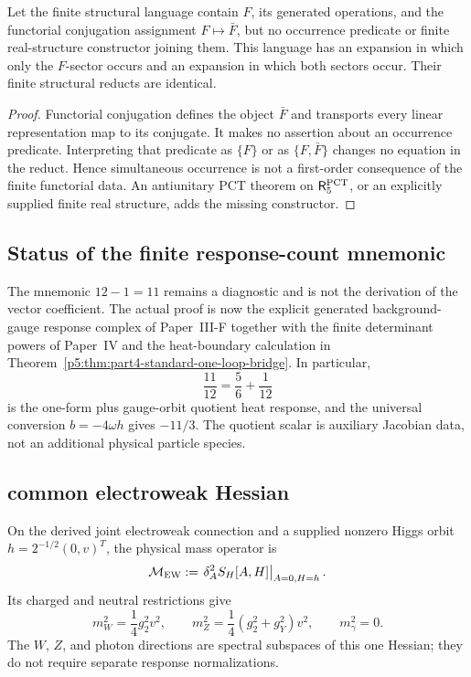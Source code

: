 \documentclass[11pt,a4paper]{article}
\begin{document}
\begin{proposition}
\label{p5:prop:conjugate-occurrence-countermodel}
Let the finite structural language contain \(F\), its generated operations,
and the functorial conjugation assignment \(F\mapsto\bar F\), but no
occurrence predicate or finite real-structure constructor joining them.  This
language has an expansion in which only the \(F\)-sector occurs and an
expansion in which both sectors occur.  Their finite structural reducts are
identical.
\end{proposition}

\begin{proof}
Functorial conjugation defines the object \(\bar F\) and transports every
linear representation map to its conjugate.  It makes no assertion about an
occurrence predicate.  Interpreting that predicate as \(\{F\}\) or as
\(\{F,\bar F\}\) changes no equation in the reduct.  Hence simultaneous
occurrence is not a first-order consequence of the finite functorial data.
An antiunitary PCT theorem on \(\mathsf R_5^{\rm PCT}\), or an explicitly
supplied finite real structure, adds the missing constructor.
\end{proof}



\subsection{Status of the finite response-count mnemonic}
\label{p5:app:finite-response-complex}

The mnemonic \(12-1=11\) remains a diagnostic and is not the derivation of
the vector coefficient.  The actual proof is now the explicit generated
background-gauge response complex of Paper~III-F together with the finite
determinant powers of Paper~IV and the heat-boundary calculation in
Theorem~\ref{p5:thm:part4-standard-one-loop-bridge}.  In particular,
\[
 \frac{11}{12}=\frac56+\frac1{12}
\]
is the one-form plus gauge-orbit quotient heat response, and the universal
conversion \(b=-4\omega h\) gives \(-11/3\).  The quotient scalar is auxiliary
Jacobian data, not an additional physical particle species.

\subsection{common electroweak Hessian}
\label{p5:sec:v164-common-ew-hessian}

\begin{theorem}
\label{p5:thm:v164-common-ew-hessian}
On the derived joint electroweak connection and a supplied nonzero Higgs orbit
\(h=2^{-1/2}(0,v)^T\), the physical mass operator is
\[
 \mathcal M_{\rm EW}
 :=\left.\delta_A^2S_H[A,H]\right|_{A=0,H=h}.
\]
Its charged and neutral restrictions give
\[
 m_W^2=\frac14g_2^2v^2,
 \qquad
 m_Z^2=\frac14(g_2^2+g_Y^2)v^2,
 \qquad
 m_\gamma^2=0.
\]
The \(W\), \(Z\), and photon directions are spectral subspaces of this one
Hessian; they do not require separate response normalizations.
\end{theorem}
\end{document}

